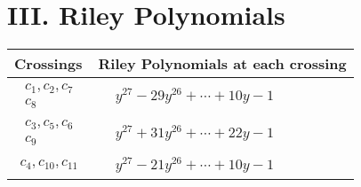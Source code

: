 \documentclass[1p]{elsarticle_modified}
\theoremstyle{definition}
\begin{document}
\centering \section*{ III. Riley Polynomials}
\begin{tabular}{m{50pt}|m{274pt}}
Crossings & \hspace{64pt}Riley Polynomials at each crossing \\
\hline $$\begin{aligned}c_{1},c_{2},c_{7}\\c_{8}\end{aligned}$$&$\begin{aligned}
&y^{27}-29 y^{26}+\cdots+10 y-1
\end{aligned}$\\
\hline $$\begin{aligned}c_{3},c_{5},c_{6}\\c_{9}\end{aligned}$$&$\begin{aligned}
&y^{27}+31 y^{26}+\cdots+22 y-1
\end{aligned}$\\
\hline $$\begin{aligned}c_{4},c_{10},c_{11}\end{aligned}$$&$\begin{aligned}
&y^{27}-21 y^{26}+\cdots+10 y-1
\end{aligned}$\\
\hline
\end{tabular}
\vskip 2pc
\end{document}
